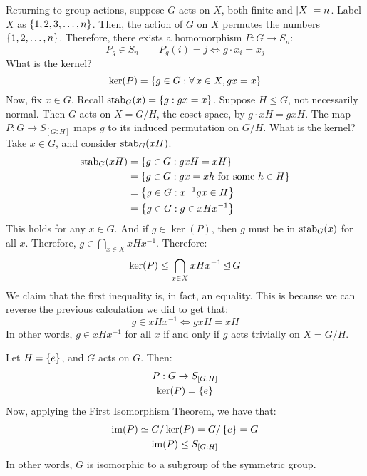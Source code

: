 Returning to group actions, suppose $ G $ acts on $ X $, both finite and $ \abs{X} = n $.
Label $ X $ as $ \left\{{1, 2, 3, \dots, n}\right\} $.
Then, the action of $ G $ on $ X $ permutes the numbers $ \left\{{1, 2, \dots, n}\right\} $.
Therefore, there exists a homomorphism $ P: G \rightarrow S_{n} $:
\begin{equation*}
    P_{g} \in S_{n} \qquad P_{g}(i) = j \iff g \cdot x_{i} = x_{j}
\end{equation*}
What is the kernel?
\begin{equation*}
    \ker(P) = \left\{{g \in G : \forall \, x \in X, gx = x}\right\}
\end{equation*}
Now, fix $ x \in G $. Recall $ \operatorname{stab}_{G}(x) = \left\{{g : gx = x}\right\} $.
Suppose $ H \leq G $, not necessarily normal.
Then $ G $ acts on $ X = G/H $, the coset space, by $ g \cdot xH = gxH $.
The map $ P: G \rightarrow S_{[G:H]} $ maps $ g $ to its induced permutation on $ G/H $.
What is the kernel? \vsp
%
Take $ x \in G $, and consider $ \operatorname{stab}_{G}(xH) $.
\begin{align*}
    \operatorname{stab}_{G}(xH) & = \left\{{g \in G : gxH = xH}\right\} \\
                  & = \left\{{g \in G : gx = xh \textrm{ for some } h \in H}\right\} \\
                  & = \left\{{g \in G : x^{-1}gx \in H}\right\} \\
                  & = \left\{{g \in G : g \in xHx^{-1}}\right\}
\end{align*}
This holds for any $ x \in G $.
And if $ g \in \ker(P) $, then $ g $ must be in $ \operatorname{stab}_{G}(x) $ for all $ x $.
Therefore, $ g \in \bigcap_{x \in X} xHx^{-1} $. Therefore:
\begin{equation*}
    \ker(P) \leq \bigcap_{x \in X} xHx^{-1} \operatorname{\trianglelefteq} G
\end{equation*}
We claim that the first inequality is, in fact, an equality.
This is because we can reverse the previous calculation we did to get that:
\begin{equation*}
    g \in xHx^{-1} \iff gxH = xH
\end{equation*}
In other words, $ g \in xHx^{-1} $ for all $ x $ if and only if $ g $ acts trivially on $ X = G/H $.

\begin{xmp}[source=Primary Source Material]
    Let $ H = \left\{{e}\right\} $, and $ G $ acts on $ G $. Then:
    \begin{gather*}
        P : G \rightarrow S_{[G:H]} \\
        \ker(P) = \left\{{e}\right\}
    \end{gather*}
    Now, applying the First Isomorphism Theorem, we have that:
    \begin{gather*}
        \operatorname{im}(P) \simeq G/\ker(P) = G/\left\{{e}\right\} = G \\
        \operatorname{im}(P) \leq S_{[G:H]}
    \end{gather*}
    In other words, $ G $ is isomorphic to a subgroup of the symmetric group.
\end{xmp}


